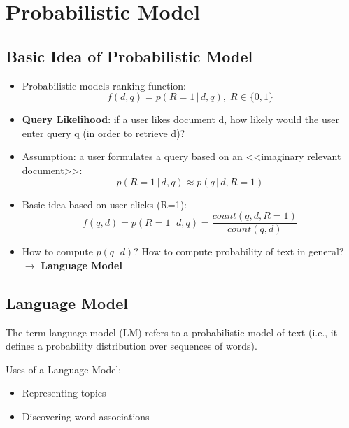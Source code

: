 \newpage
\section{Probabilistic Model}

\subsection{Basic Idea of Probabilistic Model}

\begin{itemize}
\item Probabilistic models ranking function: 
\begin{equation*}
f(d, q) = p(R=1 \,\big|\, d,q), \; R \in \{0,1\}
\end{equation*}
\item \textbf{Query Likelihood}: if a user likes document d, how likely would the user enter query q (in order to retrieve d)? 
\item Assumption: a user formulates a query based on an <<imaginary relevant document>>:
\begin{equation*}
p(R=1 \,\big|\, d,q) \approx p(q \,\big|\, d,R=1)
\end{equation*}
\item Basic idea based on user clicks (R=1):
\begin{equation*}
f(q, d) = p(R=1 \,\big|\, d,q) = \frac{count(q, d, R=1)}{count(q,d)}
\end{equation*}
\item How to compute $p(q \,|\, d)$? How to compute probability of
text in general? $\to$ \textbf{Language Model}
\end{itemize}


\subsection{Language Model}
The term language model (LM) refers to a probabilistic model of text (i.e., it defines a probability distribution over sequences of words). 

Uses of a Language Model:
\begin{itemize}
\item Representing topics
\item Discovering word associations
\end{itemize}


